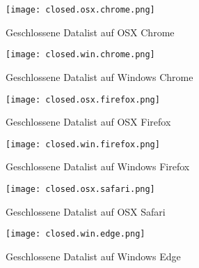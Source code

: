 

\begin{figure}[!htb]
    \centering
    \begin{minipage}[b]{0.45\textwidth}
        \centering
        \texttt{[image: closed.osx.chrome.png]}
        \caption{\centering Geschlossene Datalist auf OSX Chrome}
        \label{img:closedOsxChromeDatalist}
    \end{minipage}
    \hfill
    \begin{minipage}[b]{0.45\textwidth}
        \centering
        \texttt{[image: closed.win.chrome.png]}
        \caption{\centering Geschlossene Datalist auf Windows Chrome}
        \label{img:closedWinChromeDatalist}
    \end{minipage}
\end{figure}

\begin{figure}[!htb]
    \centering
    \begin{minipage}[b]{0.45\textwidth}
        \centering
        \texttt{[image: closed.osx.firefox.png]}
        \caption{\centering Geschlossene Datalist auf OSX Firefox}
        \label{img:closedOsxFirefoxDatalist}
    \end{minipage}
    \hfill
    \begin{minipage}[b]{0.45\textwidth}
        \centering
        \texttt{[image: closed.win.firefox.png]}
        \caption{\centering Geschlossene Datalist auf Windows Firefox}
        \label{img:closedWinFirefoxDatalist}
    \end{minipage}
\end{figure}

\begin{figure}[!htb]
    \centering
    \begin{minipage}[b]{0.45\textwidth}
        \centering
        \texttt{[image: closed.osx.safari.png]}
        \caption{\centering Geschlossene Datalist auf OSX Safari}
        \label{img:closedOsxSafariDatalist}
    \end{minipage}
    \hfill
    \begin{minipage}[b]{0.45\textwidth}
        \centering
        \texttt{[image: closed.win.edge.png]}
        \caption{\centering Geschlossene Datalist auf Windows Edge}
        \label{img:closedWinEdgeDatalist}
    \end{minipage}
\end{figure}


